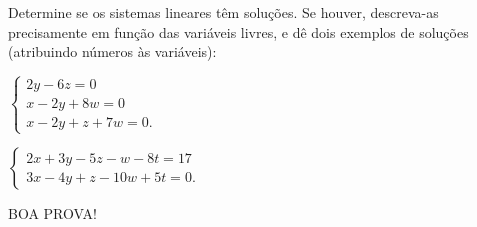 \documentclass[12pt,a4paper]{article}
\begin{document}
\begin{ExerciseList}
\Exercise[title={2,5}]
Determine se os sistemas lineares têm soluções. Se houver, descreva-as precisamente em função das variáveis livres, e dê dois exemplos de soluções (atribuindo números às variáveis):
\begin{enumerate}
\begin{multicols}{2}
\item $\begin{cases}
     2y -6z      = 0\\
 x - 2y     + 8w = 0\\
 x - 2y + z + 7w = 0.
\end{cases}$
\item $\begin{cases}
2x + 3y -5z -  w - 8t = 17\\
3x - 4y + z -10w + 5t = 0.
\end{cases}$
\end{multicols}
\end{enumerate}

\end{ExerciseList}

\begin{center}
BOA PROVA!
\end{center}

\end{document}
